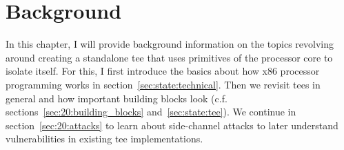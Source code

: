 \chapter{Background}
\label{sec:state}






In this chapter, I will provide background information on the topics revolving
around creating a standalone \gls{tee} that uses primitives of the processor
core to isolate itself. For this, I first introduce the basics about how x86
processor programming works in section~\ref{sec:state:technical}. Then we
revisit \glspl{tee} in general and how important building blocks look (c.f.
sections~\ref{sec:20:building_blocks} and~\ref{sec:state:tee}). We continue in
section~\ref{sec:20:attacks} to learn about side-channel attacks to later
understand vulnerabilities in existing \gls{tee} implementations.





\cleardoublepage

